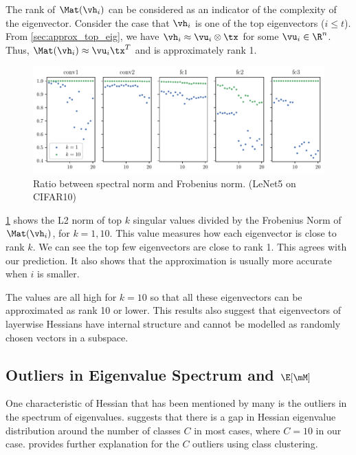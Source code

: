 The rank of $\Mat(\vh_i)$ can be considered as an indicator of the complexity of the eigenvector. Consider the case that $\vh_i$ is one of the top eigenvectors ($i \leq t$). From \cref{sec:approx_top_eig}, we have $\vh_i \approx \vu_i \otimes \tx$ for some $\vu_i \in \R^n$. Thus, $\Mat(\vh_i) \approx \vu_i\tx^T$ and is approximately rank 1.
\begin{figure}[ht]
    \centering
    \includegraphics[width=\textwidth]{Figures/Eigenvec_Lowrank/Top_Eigenvector_rank_CIFAR10_Exp1_LeNet5_fixlr0.01R1_E-1_20_top1_10.pdf}
    \captionsetup{justification=centering}
    \caption{Ratio between spectral norm and Frobenius norm. (LeNet5 on CIFAR10)}
    \label{fig:eigen_lowrank}
\end{figure}

\cref{fig:eigen_lowrank} shows the L2 norm of top $k$ singular values divided by the Frobenius Norm of $\Mat(\vh_i)$, for $k = 1,10$. This value measures how each eigenvector is close to rank $k$. We can see the top few eigenvectors are close to rank 1. This agrees with our prediction. It also shows that the approximation is usually more accurate when $i$ is smaller.

The values are all high for $k=10$ so that all these eigenvectors can be approximated as rank 10 or lower. This results also suggest that eigenvectors of layerwise Hessians have internal structure and cannot be modelled as randomly chosen vectors in a subspace. 

\subsection{Outliers in Eigenvalue Spectrum and \texorpdfstring{$\E[\mM]$}{EM}}
\label{sec:emp_outlier}
One characteristic of Hessian that has been mentioned by many is the outliers in the spectrum of eigenvalues. \citet{sagun2017empirical} suggests that there is a gap in Hessian eigenvalue distribution around the number of classes $C$ in most cases, where $C=10$ in our case. \citet{papyan2019measurements} provides further explanation for the $C$ outliers using class clustering. 

